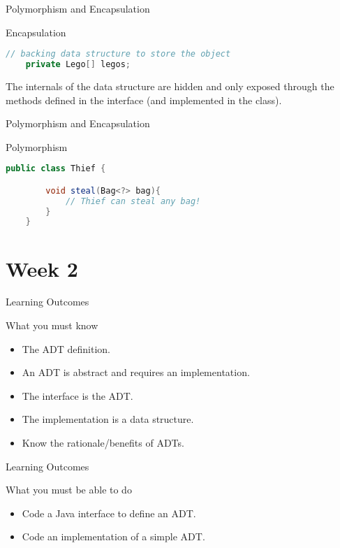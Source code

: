 \documentclass[pdf]{beamer}
\begin{document}
\begin{frame}[fragile]{Polymorphism and Encapsulation}
    \begin{block}{Encapsulation}
        \begin{lstlisting}[language=Java,basicstyle=\ttfamily\scriptsize,keywordstyle=\color{blue}]
    // backing data structure to store the object
    private Lego[] legos;
        \end{lstlisting}

        The internals of the data structure are hidden and only exposed through the methods defined in the interface (and implemented in the class).
    \end{block}
\end{frame}

\begin{frame}[fragile]{Polymorphism and Encapsulation}
    \begin{block}{Polymorphism}
        \begin{lstlisting}[language=Java,basicstyle=\ttfamily\scriptsize,keywordstyle=\color{blue}]
    public class Thief {

        void steal(Bag<?> bag){
            // Thief can steal any bag!
        }
    }
        \end{lstlisting}
    \end{block}
\end{frame}

\section{Week 2}

\begin{frame}{Learning Outcomes}
    \begin{block}{What you must know}
        \begin{itemize}
            \item The ADT definition.
            \item An ADT is abstract and requires an implementation.
            \item The interface is the ADT.
            \item The implementation is a data structure.
            \item Know the rationale/benefits of ADTs.
        \end{itemize}
    \end{block}
\end{frame}

\begin{frame}{Learning Outcomes}
    \begin{block}{What you must be able to do}
        \begin{itemize}
            \item Code a Java interface to define an ADT.
            \item Code an implementation of a simple ADT.
        \end{itemize}
    \end{block}
\end{frame}
\end{document}

